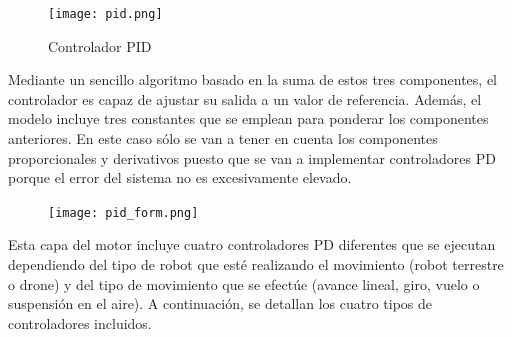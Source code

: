 \clearpage
\begin{figure}[h!]
    \centering
    \texttt{[image: pid.png]}
    \caption[Controlador PID]{Controlador PID \footnotemark}
    \label{fig:pid}
\end{figure}

Mediante un sencillo algoritmo basado en la suma de estos tres componentes, el controlador es capaz de ajustar su salida a un valor de referencia. Además, el modelo incluye tres constantes que se emplean para ponderar los componentes anteriores. En este caso sólo se van a tener en cuenta los componentes proporcionales y derivativos puesto que se van a implementar controladores PD  porque el error del sistema no es excesivamente elevado.\newline 

\begin{figure}[h!]
    \centering
    \texttt{[image: pid\_form.png]}
    \label{fig:pid_form}
\end{figure}

Esta capa del motor incluye cuatro controladores PD diferentes que se ejecutan dependiendo del tipo de robot que esté realizando el movimiento (robot terrestre o drone) y del tipo de movimiento que se efectúe (avance lineal, giro, vuelo o suspensión en el aire). A continuación, se detallan los cuatro tipos de controladores incluidos.

